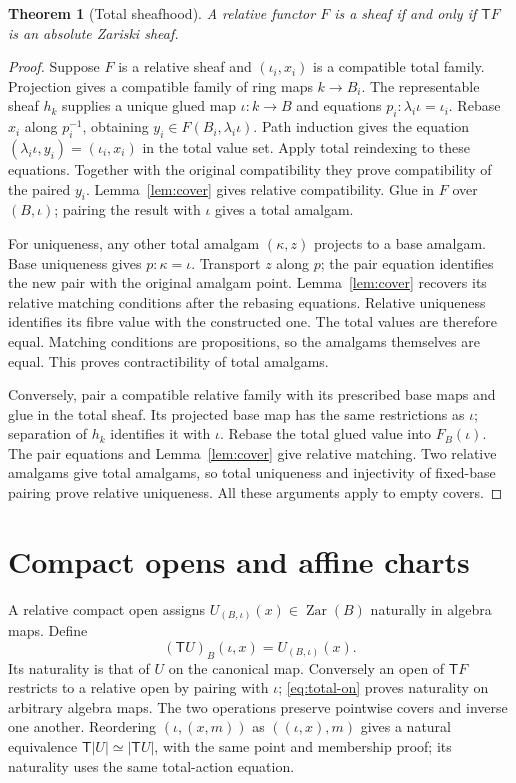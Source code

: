 \documentclass[11pt]{amsart}
\newtheorem{theorem}{Theorem}[section]
\theoremstyle{definition}\newtheorem{definition}[theorem]{Definition}
\begin{document}
\begin{theorem}[Total sheafhood]\label{thm:sheaf}
A relative functor $F$ is a sheaf if and only if $\mathsf T F$ is an
absolute Zariski sheaf.
\end{theorem}
\begin{proof}
Suppose $F$ is a relative sheaf and $(\iota_i,x_i)$ is a compatible total
family. Projection gives a compatible family of ring maps $k\to B_i$.
The representable sheaf $h_k$ supplies a unique glued map $\iota:k\to B$
and equations $p_i:\lambda_i\iota=\iota_i$.
Rebase $x_i$ along $p_i^{-1}$, obtaining
$y_i\in F(B_i,\lambda_i\iota)$. Path induction gives the equation
$(\lambda_i\iota,y_i)=(\iota_i,x_i)$ in the total value set.
Apply total reindexing to these equations. Together with the original
compatibility they prove compatibility of the paired $y_i$.
Lemma~\ref{lem:cover} gives relative compatibility. Glue in $F$ over
$(B,\iota)$; pairing the result with $\iota$ gives a total amalgam.

For uniqueness, any other total amalgam $(\kappa,z)$ projects to a
base amalgam. Base uniqueness gives $p:\kappa=\iota$. Transport $z$
along $p$; the pair equation identifies the new pair with the original
amalgam point. Lemma~\ref{lem:cover} recovers its relative matching
conditions after the rebasing equations. Relative uniqueness identifies
its fibre value with the constructed one. The total values are therefore
equal. Matching conditions are propositions, so the amalgams themselves
are equal. This proves contractibility of total amalgams.

Conversely, pair a compatible relative family with its prescribed base
maps and glue in the total sheaf. Its projected base map has the same
restrictions as $\iota$; separation of $h_k$ identifies it with $\iota$.
Rebase the total glued value into $F_B(\iota)$. The pair equations and
Lemma~\ref{lem:cover} give relative matching. Two relative amalgams give
total amalgams, so total uniqueness and injectivity of fixed-base pairing
prove relative uniqueness. All these arguments apply to empty covers.
\end{proof}

\section{Compact opens and affine charts}
A relative compact open assigns $U_{(B,\iota)}(x)\in\operatorname{Zar}(B)$
naturally in algebra maps. Define
\[
 (\mathsf T U)_B(\iota,x)=U_{(B,\iota)}(x).
\]
Its naturality is that of $U$ on the canonical map. Conversely an open of
$\mathsf T F$ restricts to a relative open by pairing with $\iota$;
\eqref{eq:total-on} proves naturality on arbitrary algebra maps.
The two operations preserve pointwise covers and inverse one another.
Reordering $(\iota,(x,m))$ as $((\iota,x),m)$ gives a natural equivalence
$\mathsf T|U|\simeq|\mathsf T U|$, with the same point and membership
proof; its naturality uses the same total-action equation.
\end{document}
